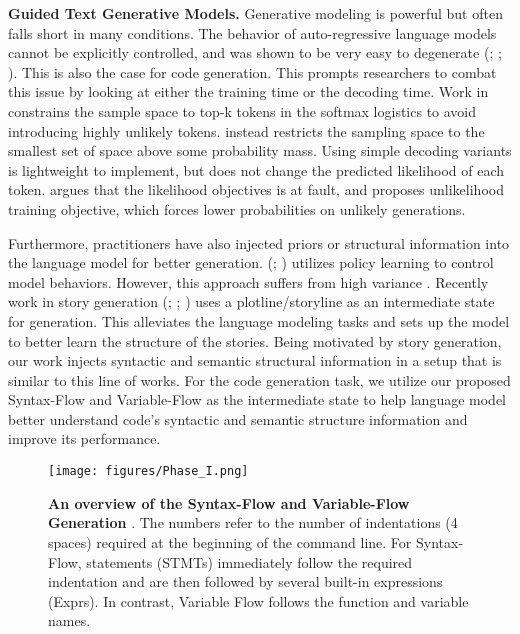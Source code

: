 \documentclass[11pt]{article}
\begin{document}
\textbf{Guided Text Generative Models.} Generative modeling is powerful but often falls short in many conditions. The behavior of auto-regressive language models cannot be explicitly controlled, and was shown to be very easy to degenerate (\citealp[]{Holtzman2020TheCC}; \citealp[]{Welleck2020NeuralTG}; \citealp[]{Meister2020IfBS}). This is also the case for code generation. This prompts researchers to combat this issue by looking at either the training time or the decoding time. Work in \citep{Fan2018HierarchicalNS} constrains the sample space to top-k tokens in the softmax logistics to avoid introducing highly unlikely tokens. \citep{Holtzman2020TheCC} instead restricts the sampling space to the smallest set of space above some probability mass. Using simple decoding variants is lightweight to implement, but does not change the predicted likelihood of each token. \citep{Welleck2020NeuralTG} argues that the likelihood objectives is at fault, and proposes unlikelihood training objective, which forces lower probabilities on unlikely generations. 

Furthermore, practitioners have also injected priors or structural information into the language model for better generation. (\citealp[]{Zhang2020OptimizingTF}; \citealp[]{Lagutin2021ImplicitUT}) utilizes policy learning to control model behaviors. However, this approach suffers from high variance \citep{Choshen2020OnTW}. Recently work in story generation (\citealp[]{Yao2019PlanAndWriteTB}; \citealp[]{Rashkin2020PlotMachinesOG}; \citealp[]{GoldfarbTarrant2020ContentPF}) uses a plotline/storyline as an intermediate state for generation. This alleviates the language modeling tasks and sets up the model to better learn the structure of the stories. Being motivated by story generation, our work injects syntactic and semantic structural information in a setup that is similar to this line of works. For the code generation task, we utilize our proposed Syntax-Flow and Variable-Flow  as the intermediate state to help language model better understand code's syntactic and semantic structure information and improve its performance.


\begin{figure*}[ht] 
\centering
\texttt{[image: figures/Phase\_I.png]}
\vspace{-10pt}
\caption{\textbf{An overview of the Syntax-Flow and Variable-Flow Generation }. The numbers refer to the number of indentations (4 spaces) required at the beginning of the command line.  For Syntax-Flow, statements (STMTs) immediately follow the required indentation and are then followed by several built-in expressions (Exprs). In contrast, Variable Flow follows the function and variable names.}
\label{fig:phase_I}
\end{figure*}
\end{document}
